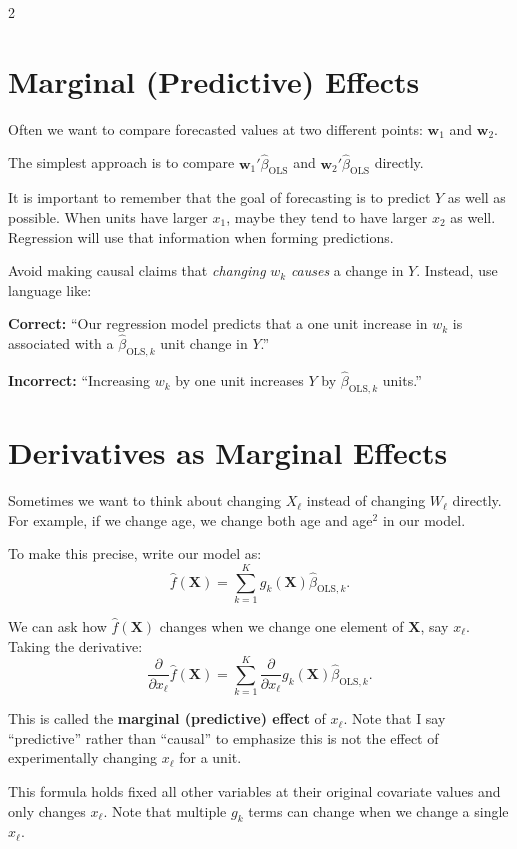 \documentclass[12pt]{article}
\begin{document}
\begin{multicols}{2}
  \section*{Marginal (Predictive) Effects}

  Often we want to compare forecasted values at two different points: $\bm{w}_1$ and $\bm{w}_2$.

  The simplest approach is to compare $\bm{w}_1' \hat{\beta}_{\text{OLS}}$ and $\bm{w}_2' \hat{\beta}_{\text{OLS}}$ directly.

  It is important to remember that the goal of forecasting is to predict $Y$ as well as possible. When units have larger $x_1$, maybe they tend to have larger $x_2$ as well. Regression will use that information when forming predictions.

  Avoid making causal claims that \emph{changing} $w_k$ \emph{causes} a change in $Y$. Instead, use language like:

  \textbf{Correct:} ``Our regression model predicts that a one unit increase in $w_k$ is associated with a $\hat{\beta}_{\text{OLS},k}$ unit change in $Y$.''

  \textbf{Incorrect:} ``Increasing $w_k$ by one unit increases $Y$ by $\hat{\beta}_{\text{OLS},k}$ units.''

  \section*{Derivatives as Marginal Effects}

  Sometimes we want to think about changing $X_\ell$ instead of changing $W_\ell$ directly. For example, if we change age, we change both age and age$^2$ in our model.

  To make this precise, write our model as:
  $$
  \hat{f}(\bm{X}) = \sum_{k=1}^K g_k(\bm{X}) \hat{\beta}_{\text{OLS}, k}.
  $$

  We can ask how $\hat{f}(\bm{X})$ changes when we change one element of $\bm{X}$, say $x_\ell$. Taking the derivative:
  $$
  \frac{\partial}{\partial x_\ell} \hat{f}(\bm{X}) = \sum_{k=1}^K \frac{\partial}{\partial x_\ell} g_k(\bm{X}) \hat{\beta}_{\text{OLS}, k}.
  $$

  This is called the \textbf{marginal (predictive) effect} of $x_\ell$. Note that I say ``predictive'' rather than ``causal'' to emphasize this is not the effect of experimentally changing $x_\ell$ for a unit.

  This formula holds fixed all other variables at their original covariate values and only changes $x_\ell$. Note that multiple $g_k$ terms can change when we change a single $x_\ell$.


\end{multicols}
\end{document}

